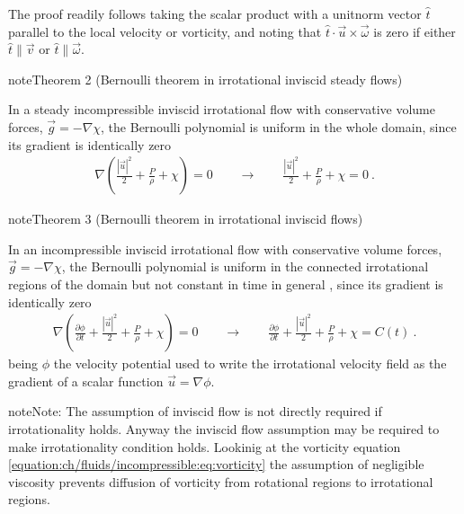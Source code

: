 \documentclass[letterpaper,10pt,english]{jupyterBook}
\begin{document}
\sphinxAtStartPar
The proof readily follows taking the scalar product with a unit\sphinxhyphen{}norm vector \(\hat{t}\) parallel to the local velocity or vorticity, and noting that \(\hat{t} \cdot \vec{u} \times \vec{\omega}\) is zero if either \(\hat{t} \parallel \vec{v}\) or \(\hat{t} \parallel \vec{\omega}\).
\label{ch/fluids/incompressible:theorem-1}
\begin{sphinxadmonition}{note}{Theorem 2 (Bernoulli theorem in irrotational inviscid steady flows)}



\sphinxAtStartPar
In a steady incompressible inviscid irrotational flow with conservative volume forces, \(\vec{g} = - \nabla \chi\), the Bernoulli polynomial is uniform in the whole domain, since its gradient is identically zero
\begin{equation*}
\begin{split}\nabla \left( \frac{|\vec{u}|^2}{2} + \frac{P}{\rho} + \chi \right) = 0 
\qquad \rightarrow \qquad \frac{|\vec{u}|^2}{2} + \frac{P}{\rho} + \chi = 0 \ .\end{split}
\end{equation*}\end{sphinxadmonition}
\label{ch/fluids/incompressible:theorem-2}
\begin{sphinxadmonition}{note}{Theorem 3 (Bernoulli theorem in irrotational inviscid flows)}



\sphinxAtStartPar
In an incompressible inviscid irrotational flow with conservative volume forces, \(\vec{g} = - \nabla \chi\), the Bernoulli polynomial is uniform in the connected irrotational regions of the domain \sphinxhyphen{} but not constant in time in general \sphinxhyphen{} , since its gradient is identically zero
\begin{equation*}
\begin{split}\nabla \left( \frac{\partial \phi}{\partial t} + \frac{|\vec{u}|^2}{2} + \frac{P}{\rho} + \chi \right) = 0 
\qquad \rightarrow \qquad \frac{\partial \phi}{\partial t} + \frac{|\vec{u}|^2}{2} + \frac{P}{\rho} + \chi = C(t) \ .\end{split}
\end{equation*}
\sphinxAtStartPar
being \(\phi\) the velocity potential used to write the irrotational velocity field as the gradient of a scalar function \(\vec{u} = \nabla \phi\).
\end{sphinxadmonition}

\begin{sphinxadmonition}{note}{Note:}
\sphinxAtStartPar
The assumption of inviscid flow is not directly required if irrotationality holds. Anyway the inviscid flow assumption may be required to make irrotationality condition holds. Lookinig at the vorticity equation \eqref{equation:ch/fluids/incompressible:eq:vorticity} the assumption of negligible viscosity prevents diffusion of vorticity from rotational regions to irrotational regions.
\end{sphinxadmonition}
\end{document}
